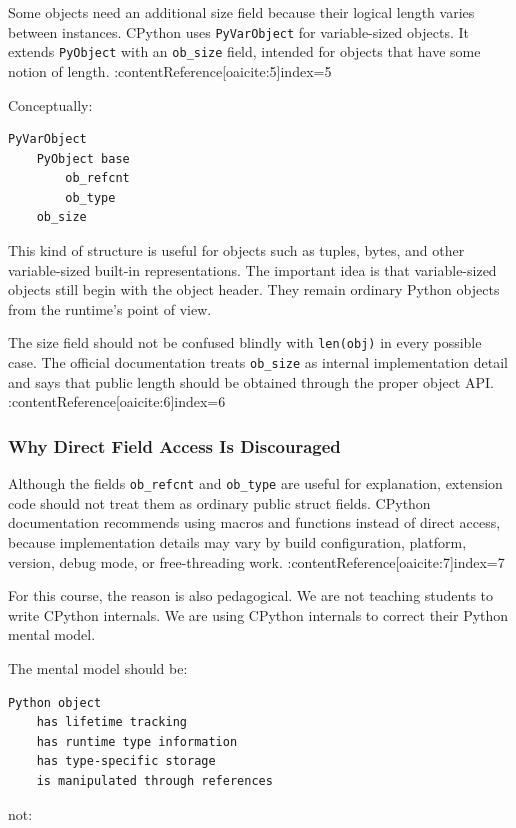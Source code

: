 Some objects need an additional size field because their logical length varies between instances. CPython uses \texttt{PyVarObject} for variable-sized objects. It extends \texttt{PyObject} with an \texttt{ob\_size} field, intended for objects that have some notion of length. :contentReference[oaicite:5]{index=5}

Conceptually:

\begin{verbatim}
PyVarObject
    PyObject base
        ob_refcnt
        ob_type
    ob_size
\end{verbatim}

This kind of structure is useful for objects such as tuples, bytes, and other variable-sized built-in representations. The important idea is that variable-sized objects still begin with the object header. They remain ordinary Python objects from the runtime's point of view.

The size field should not be confused blindly with \texttt{len(obj)} in every possible case. The official documentation treats \texttt{ob\_size} as internal implementation detail and says that public length should be obtained through the proper object API. :contentReference[oaicite:6]{index=6}

\subsubsection*{Why Direct Field Access Is Discouraged}

Although the fields \texttt{ob\_refcnt} and \texttt{ob\_type} are useful for explanation, extension code should not treat them as ordinary public struct fields. CPython documentation recommends using macros and functions instead of direct access, because implementation details may vary by build configuration, platform, version, debug mode, or free-threading work. :contentReference[oaicite:7]{index=7}

For this course, the reason is also pedagogical. We are not teaching students to write CPython internals. We are using CPython internals to correct their Python mental model.

The mental model should be:

\begin{verbatim}
Python object
    has lifetime tracking
    has runtime type information
    has type-specific storage
    is manipulated through references
\end{verbatim}

not:

